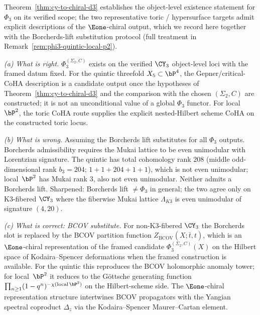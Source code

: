 \begin{remark}
\label{rem:phi3-quintic-local-p2-preview}
Theorem~\textup{\ref{thm:cy-to-chiral-d3}} establishes the object-level
existence statement for $\Phi_3$ on its verified scope; the two
representative toric / hypersurface
targets admit explicit descriptions of the $\Eone$-chiral output, which
we record here together with the Borcherds-lift substitution protocol
\textup{(}full treatment in Remark~\textup{\ref{rem:phi3-quintic-local-p2}}\textup{).}

\emph{(a) What is right.} $\Phi_3^{(\Sigma_2,C)}$ exists on the verified
$\CY_3$ object-level loci with the framed datum fixed. For the quintic
threefold $X_5 \subset \bP^4$, the Gepner/critical-CoHA description is a
candidate output once the hypotheses of Theorem~\ref{thm:cy-to-chiral-d3}
and the comparison with the chosen $(\Sigma_2,C)$ are constructed; it is not
an unconditional value of a global $\Phi_3$ functor. For local~$\bP^2$, the
toric CoHA route supplies the explicit nested-Hilbert scheme CoHA on the
constructed toric locus.

\emph{(b) What is wrong.} Assuming the Borcherds lift substitutes for
all $\Phi_3$ outputs. Borcherds admissibility requires the Mukai lattice
to be even unimodular with Lorentzian signature. The quintic has total
cohomology rank $208$ \textup{(}middle odd-dimensional rank $b_3 = 204$;
$1 + 1 + 204 + 1 + 1$\textup{),} which is not even unimodular; local~$\bP^2$
has Mukai rank $3$, also not even unimodular. Neither admits a Borcherds
lift. Sharpened:
Borcherds lift $\neq \Phi_3$ in general; the two agree only on
K3-fibered $\CY_3$ where the fiberwise Mukai lattice $\Lambda_{K3}$ is
even unimodular of signature $(4, 20)$.

\emph{(c) What is correct: BCOV substitute.} For non-K3-fibered $\CY_3$
the Borcherds slot is replaced by the BCOV partition function
$Z_{\mathrm{BCOV}}(X; \bar{t}, t)$, which is an $\Eone$-chiral representation of
the framed candidate $\Phi_3^{(\Sigma_2,C)}(X)$ on the Hilbert space of
Kodaira--Spencer deformations when the framed construction is available. For
the quintic this reproduces the BCOV holomorphic anomaly tower; for
local~$\bP^2$ it reduces to the G\"ottsche generating function
$\prod_{n \geq 1}(1 - q^n)^{-\chi(\mathrm{local}\,\bP^2)}$ on the
Hilbert-scheme side. The $\Eone$-chiral representation structure
intertwines BCOV propagators with the Yangian spectral coproduct
$\Delta_z$ via the Kodaira--Spencer Maurer--Cartan element.
\end{remark}


